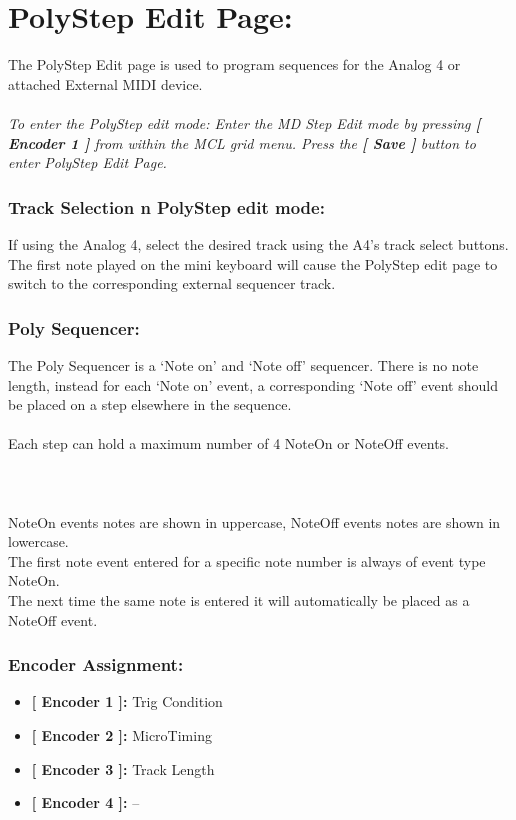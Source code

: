 \chapter{PolyStep Edit Page:}
The PolyStep Edit page is used to program sequences for the Analog 4 or attached External MIDI device.\\
\\
\textit{To enter the PolyStep edit mode: Enter the MD Step Edit mode by pressing \textbf{[ Encoder 1 ]} from within the MCL grid menu. Press the \textbf{[ Save ]} button to enter PolyStep Edit Page.}\\
\subsection{Track Selection n PolyStep edit mode:}
If using the Analog 4, select the desired track using the A4’s track select buttons. The first note played on the mini keyboard will cause the PolyStep edit page to switch to  the corresponding external sequencer track.
\subsection{Poly Sequencer: }
The Poly Sequencer is a ‘Note on’ and ‘Note off’ sequencer. There is no note length, instead for each ‘Note on’ event, a corresponding ‘Note off’ event should be placed on a step elsewhere in the sequence.\\
\\
Each step can hold a maximum number of 4 NoteOn or NoteOff events.\\\\
\\
\\
NoteOn events notes are shown in uppercase, NoteOff events notes are shown in lowercase.
\\
The first note event entered for a specific note number is always of event type NoteOn.\\
The next time the same note is entered it will automatically be placed as a NoteOff event.
\subsection{Encoder Assignment:}
\begin{itemize}
	\item \textbf{[ Encoder 1 ]: } Trig Condition
	\item \textbf{[ Encoder 2 ]: } MicroTiming
	\item \textbf{[ Encoder 3 ]: } Track Length
	\item \textbf{[ Encoder 4 ]: } --
\end{itemize}

